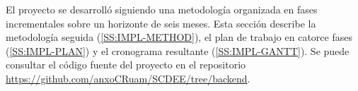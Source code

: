 El proyecto se desarrolló siguiendo una metodología organizada en fases
incrementales sobre un horizonte de seis meses. Esta sección describe la
metodología seguida (\cref{SS:IMPL-METHOD}), el plan de trabajo en
catorce fases (\cref{SS:IMPL-PLAN}) y el cronograma resultante
(\cref{SS:IMPL-GANTT}). Se puede consultar el código fuente del proyecto en el repositorio
\url{https://github.com/anxoCRuam/SCDEE/tree/backend}.
